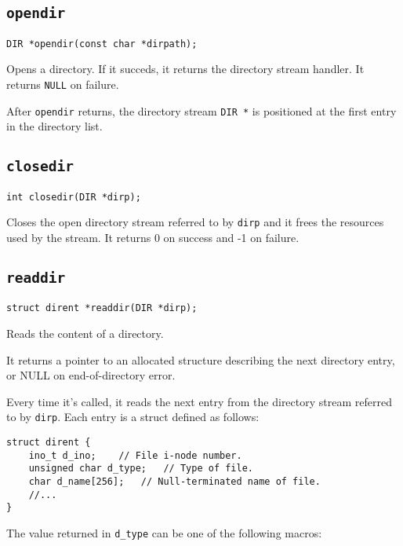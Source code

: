 \documentclass{article}
\begin{document}
\subsection{\texttt{opendir}}

\begin{verbatim}
DIR *opendir(const char *dirpath);
\end{verbatim}

Opens a directory. If it succeds, it returns the directory stream handler. It returns \texttt{NULL} on failure.

After \texttt{opendir} returns, the directory stream \texttt{DIR *} is positioned at the first entry in the directory list.


\subsection{\texttt{closedir}}

\begin{verbatim}
int closedir(DIR *dirp);
\end{verbatim}

Closes the open directory stream referred to by \texttt{dirp} and it frees the resources used by the stream. It returns 0 on success and -1 on failure.


\subsection{\texttt{readdir}}

\begin{verbatim}
struct dirent *readdir(DIR *dirp);
\end{verbatim}

Reads the content of a directory.

It returns a pointer to an allocated structure describing the next directory entry, or NULL on end-of-directory error.

Every time it's called, it reads the next entry from the directory stream referred to by \texttt{dirp}. Each entry is a struct defined as follows:

\begin{verbatim}
struct dirent {
    ino_t d_ino;    // File i-node number.
    unsigned char d_type;   // Type of file.
    char d_name[256];   // Null-terminated name of file.
    //...
} \end{verbatim}

The value returned in \texttt{d\_type} can be one of the following macros:
\end{document}
